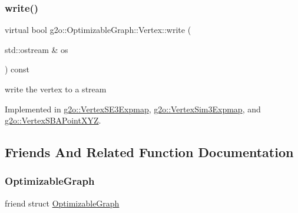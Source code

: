 \mbox{\label{classg2o_1_1_optimizable_graph_1_1_vertex_a4cac277db656fddb5f844d9009d601eb}} 
\subsubsection{\texorpdfstring{write()}{write()}}
{\footnotesize\ttfamily virtual bool g2o\+::\+Optimizable\+Graph\+::\+Vertex\+::write (\begin{DoxyParamCaption}\item[{std\+::ostream \&}]{os }\end{DoxyParamCaption}) const\hspace{0.3cm}{\ttfamily [pure virtual]}}



write the vertex to a stream 



Implemented in \mbox{\hyperlink{classg2o_1_1_vertex_s_e3_expmap_ac1dfa6c71532f2e0bed236220bc1b604}{g2o\+::\+Vertex\+S\+E3\+Expmap}}, \mbox{\hyperlink{classg2o_1_1_vertex_sim3_expmap_ab5725f98a0d40f4cdb5d352a45c79fc7}{g2o\+::\+Vertex\+Sim3\+Expmap}}, and \mbox{\hyperlink{classg2o_1_1_vertex_s_b_a_point_x_y_z_a6b2fc33f2107c039d441e1bd2a17973a}{g2o\+::\+Vertex\+S\+B\+A\+Point\+X\+YZ}}.



\subsection{Friends And Related Function Documentation}
\mbox{\label{classg2o_1_1_optimizable_graph_1_1_vertex_a45d35331ee3deca38c26d1efb6b961ae}} 
\subsubsection{\texorpdfstring{Optimizable\+Graph}{OptimizableGraph}}
{\footnotesize\ttfamily friend struct \mbox{\hyperlink{structg2o_1_1_optimizable_graph}{Optimizable\+Graph}}\hspace{0.3cm}{\ttfamily [friend]}}



